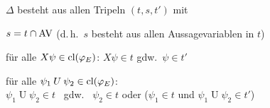 \begin{frame}
      \par\bigskip\bigskip
      $\Delta$ besteht aus allen Tripeln $(t,s,t')$ mit
      \begin{Enumerate}
        \item
          $s = t \cap \textup{AV}$
          \hfill
          {\small (d.\,h.\ $s$ besteht aus allen Aussagevariablen in $t$)}
          \par\smallskip
        \item<2->
          für alle $X\psi \in \textup{cl}(\varphi_E)$:\quad
          $X\psi \in t$ gdw.\ $\psi \in t'$
          \par\smallskip
        \item<3->
          für alle $\psi_1 \mathbin{U} \psi_2 \in \textup{cl}(\varphi_E)$:\\
          $\psi_1 \mathbin{U} \psi_2 \in t$ ~gdw.~
          $\psi_2 \in t$ oder ($\psi_1 \in t$ und $\psi_1 \mathbin{U} \psi_2 \in t'$)
          \par\smallskip
             \Danger%
      \end{Enumerate}

      \par\bigskip
%         

    \end{frame}

